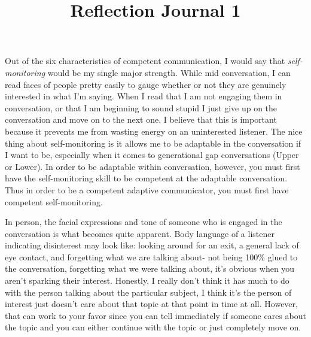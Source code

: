 \documentclass[12pt]{article}
\begin{document}
\title{Reflection Journal 1}




\par
Out of the six characteristics of competent communication, I would say that \emph{self-monitoring} would be my single major strength. While mid conversation, I can read faces of people pretty easily to gauge whether or not they are genuinely interested in what I'm saying. When I read that I am not engaging them in conversation, or that I am beginning to sound stupid I just give up on the conversation and move on to the next one. I believe that this is important because it prevents me from wasting energy on an uninterested listener. The nice thing about self-monitoring is it allows me to be adaptable in the conversation if I want to be, especially when it comes to generational gap conversations (Upper or Lower). In order to be adaptable within conversation, however, you must first have the self-monitoring skill to be competent at the adaptable conversation. Thus in order to be a competent adaptive communicator, you must first have competent self-monitoring.
\par 
In person, the facial expressions and tone of someone who is engaged in the conversation is what becomes quite apparent. Body language of a listener indicating disinterest may look like: looking around for an exit, a general lack of eye contact, and forgetting what we are talking about- not being 100\% glued to the conversation, forgetting what we were talking about, it's obvious when you aren't sparking their interest. Honestly, I really don't think it has much to do with the person talking about the particular subject, I think it's the person of interest just doesn't care about that topic at that point in time at all. However, that can work to your favor since you can tell immediately if someone cares about the topic and you can either continue with the topic or just completely move on.
\end{document}
